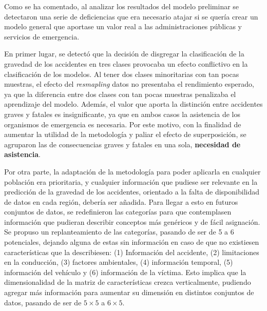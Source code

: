 

Como se ha comentado, al analizar los resultados del modelo preliminar se detectaron una serie de deficiencias que era necesario atajar si se quería crear un modelo general que aportase un valor real a las administraciones públicas y servicios de emergencia.

En primer lugar, se detectó que la decisión de disgregar la clasificación de la gravedad de los accidentes en tres clases provocaba un efecto conflictivo en la clasificación de los modelos. Al tener dos clases minoritarias con tan pocas muestras, el efecto del \textit{resmapling} datos no presentaba el rendimiento esperado, ya que la diferencia entre dos clases con tan pocas muestras penalizaba el aprendizaje del modelo. Además, el valor que aporta la distinción entre accidentes graves y fatales es insignificante, ya que en ambos casos la asistencia de los organismos de emergencia es necesaria. Por este motivo, con la finalidad de aumentar la utilidad de la metodología y paliar el efecto de superposición, se agruparon las de consecuencias graves y fatales en una sola, \textbf{necesidad de asistencia}.




Por otra parte, la adaptación de la metodología para poder aplicarla en cualquier población era prioritaria, y cualquier información que pudiese ser relevante en la predicción de la gravedad de los accidentes, orientado a la falta de disponibilidad de datos en cada región, debería ser añadida. Para llegar a esto en futuros conjuntos de datos, se redefinieron las categorías para que contemplasen información que pudieran describir conceptos más genéricos y de fácil asignación. Se propuso un replanteamiento de las categorías, pasando de ser de 5 a 6 potenciales, dejando alguna de estas sin información en caso de que no existiesen características que la describiesen: (1) Información del accidente, (2) limitaciones en la conducción, (3) factores ambientales, (4) información temporal, (5) información del vehículo y (6) información de la víctima. Esto implica que la dimensionalidad de la matriz de características crezca verticalmente, pudiendo agregar más información para aumentar su dimensión en distintos conjuntos de datos, pasando de ser de $5 \times 5$ a $6 \times 5$.


